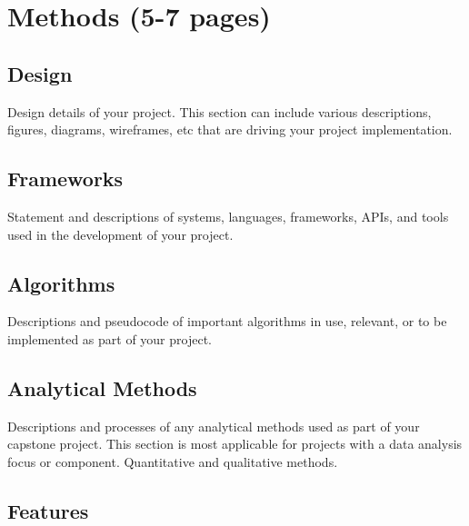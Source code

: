 \chapter{Methods (5-7 pages)}


\section{Design}

Design details of your project. This section can include various descriptions, figures, diagrams, wireframes, etc that are driving your project implementation.




\section{Frameworks}

Statement and descriptions of systems, languages, frameworks, APIs, and tools used in the development of your project.




\section{Algorithms}

Descriptions and pseudocode of important algorithms in use, relevant, or to be implemented as part of your project.




\section{Analytical Methods}

Descriptions and processes of any analytical methods used as part of your capstone project. This section is most applicable for projects with a data analysis focus or component. Quantitative and qualitative methods.




\section{Features}

